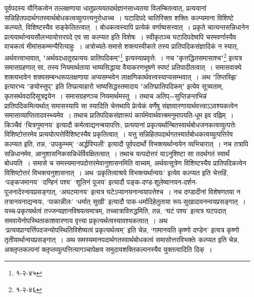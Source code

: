 {{{{पूर्वपदस्य यौगिकत्वेन तल्लक्षणाया धातुप्रत्ययतदर्थज्ञानसाध्यतया विलम्बितत्वात्, प्रत्ययानां सन्निहितपदार्थगतस्वार्थबोधकत्वव्युत्पत्त्यनुरोधाच्च~।
 घटादिपदे चातिरिक्ता शक्तिः कल्प्यमाना विशिष्टे कल्प्यते, विशिष्टस्यैव सङ्केतितत्वात्~।
बोधकत्वस्यापि प्रत्येकं वर्णाष्वसत्त्वात्~।
प्रकृते चात्यन्तसन्निधानेन प्रत्ययार्थान्वयसौलभ्यायोत्तरपदे एव सा कल्प्यत इति विशेषः~।
 स्वीकृतञ्च घटादिपदेष्वपि चरमवर्णास्यैव वाचकत्वं मीमांसकम्मन्यैरित्याहुः~।
 अत्रोच्यते-समासे शक्त्यस्वीकारे तस्य प्रातिपदिकसंज्ञादिकं न स्यात्, अर्थवत्त्वाभावात्, "अर्थवदधातुरप्रत्ययः प्रातिपदिकम्"\footnote{१-२-४५} इत्यस्याप्रवृत्तेः~।
नच "कृत्तद्धितसमासाश्च"\footnote{१-२-४६} इत्यत्र समासग्रहणात् सा, तस्य नियमार्थताया भाष्यसिद्धाया वैयाकरणभूषणे स्पष्टं प्रतिपादीतत्वात्~।
 समासवाक्ये शक्त्यभावेन शक्यसम्बन्धरूपलक्षणाया अप्यसम्भवेन लाक्षणिकार्थवत्त्वस्याप्यसम्भवात्~।
अथ "तिप्तस्झि' इत्यारभ्य "ङयोस्सुप्" इति तिप्प्रत्याहारो भाष्यसिद्धस्तमादाय "अतिप्प्रातिपदिकम्" इत्येव सूत्र्यताम्, कृतसर्थवदादिसूत्रद्वयेन~।
समासग्रहणञ्च नियमार्थमस्तु~।
तथाच अतिप्=सुप्तिङन्तभिन्नं प्रातिपदिकमित्यर्थात् समासस्यापि सा स्यादिति चेत्तथापि प्रेत्येकं वर्णेषु संज्ञावारणायार्थवत्त्वाऽऽवश्यकत्वेन समासाव्याप्तितादवस्थ्यमेव~।
तथाच प्रातिपदिकसंज्ञारूपं कार्यमेवार्थवत्त्बमनुमापयति-धूम इव वह्निम्~।
 किञ्चैवं `चित्रगुमानय' इत्यादौ कर्मत्वाद्यनन्बयापत्तिः, प्रत्ययानां प्रकृत्यर्थान्बितस्वार्थबोधजनकत्वव्युत्पत्तेः विशिष्टोत्तरमेव प्रत्ययोत्पत्तेर्विशिष्टस्यैव प्रकृतित्वात्~।
यत्तु सन्निहितपदार्थगतस्वार्तबोधकत्वव्युत्पत्तिरेव कल्प्यत इति, तन्न, `उपकुम्भम्' `अर्द्धपिप्पली' इत्यादौ पूर्वपदार्थो विभक्त्यर्थान्वयेन व्यभिचारात्~।
 नच तत्रापि सन्निधानमेव, आनुशासनिकसन्निधेर्विवक्षितत्वात्~।
तथाच यत्पदोत्तरं याऽनुशिष्टा सा तदर्थगतं स्वार्थं बोधयति~।
समासे च समस्यमानपदोत्तरमेवानुशासनमिति वाच्यम्, अर्थवत्सूत्रेण विशिष्टस्यैव प्रातिपदिकत्वेन विशिष्टोत्तरं विभक्त्यनुशासनात्~।
 अथ `प्रकृतित्वाश्रये विभक्त्यर्थान्वयः' इत्येव कल्प्यत इति चेत्तहिं, `पङ्कजमानय' `दण्हिनं पश्य' `शूलिनं पूजय' इत्यादौ पङ्क-दण्ड-शूलेष्वानयन-दर्शन-पूजनादेरन्वयप्रसङ्गात्, `अघटमानय' इत्यत्र घटेऽप्यानयनान्वयापत्तेश्च~।
नच दण्डादीनां विशेषणतया न तत्रानयनाद्यन्वयः, `पाकान्नीलः' `धर्मात् सुखी' इत्यादौ पाक-धर्मादिहेतुताया रूप-सुखादावनन्वयप्रसङ्गात्~।
यच्च-प्रकृत्यर्थत्वं तज्जन्यज्ञानविषयत्वमात्रम्, तच्चात्राविरुद्धमिति, तन्न, `घटं पश्य' इत्यत्र घटपदात् समवायेनोपस्थिताकाशवारणाय वृत्त्या प्रकृत्यर्थत्वस्यावश्यकत्वात्~।
 अथ `प्रत्ययप्राग्वर्त्तिपदजन्योपस्थितिविशेष्यत्वं प्रकृत्यर्थत्वम्' इति चेन्न, `गामानयति कृष्णो दण्डेन' इत्यत्र कृष्णो तृतीयार्थान्वयप्रसङ्गात्~।
 अथ समस्यमानपदार्थगतस्वार्थबोधकत्वं समासोत्तरविभक्तेः कल्प्यत इति चेन्न, अक्लृप्तकल्पनां क्लृप्तव्युत्पत्तित्यागञ्चापेक्षय समुदायशक्तिकल्पनस्यैव युक्तत्वादिति दिक्~।
}}}}

